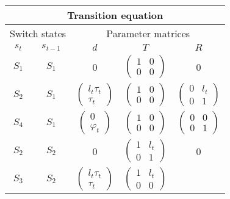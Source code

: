 \documentclass[11pt]{article}
\begin{document}
\begin{table}[h!]
\centering
\begin{tabular}[h!]{cc|ccc}
  \hline\hline
  \multicolumn{5}{c}{Transition equation}\\
  \hline
  \multicolumn{2}{c|}{Switch states} & \multicolumn{3}{c}{Parameter
                                      matrices}\\
  $s_{t}$ & $s_{t-1}$ & $d$ & $T$ & $R$ \\
  \hline
  $S_1$ &  $S_1$ & 0 & $\begin{pmatrix}1&0\\0&0\end{pmatrix}$ & 0\\
  $S_2$ & $S_1$ & $\begin{pmatrix} l_t\tau_t\\ \tau_t\end{pmatrix}$ 
                                    & $\begin{pmatrix} 1 & 0 \\ 0 &
                                      0 \end{pmatrix}$ 
          & $\begin{pmatrix} 0 & l_t\\ 0 & 1 \end{pmatrix}$\\
  $S_4$ & $S_1$ & $\begin{pmatrix}0\\\varphi_t\end{pmatrix}$ 
                                     & $\begin{pmatrix}1&0\\0&0\end{pmatrix}$
          & $\begin{pmatrix}0&0\\0&1\end{pmatrix}$\\
  $S_2$ & $S_2$ & 0 & $\begin{pmatrix} 1 & l_t \\ 0 &
    1 \end{pmatrix}$ & 0\\
  $S_3$ & $S_2$ & $\begin{pmatrix} l_t\tau_t\\ \tau_t\end{pmatrix}$ 
                                    & $\begin{pmatrix} 1 & l_t \\ 0 &
                                      0 \end{pmatrix}$ 

\end{tabular}
\end{table}
\end{document}
